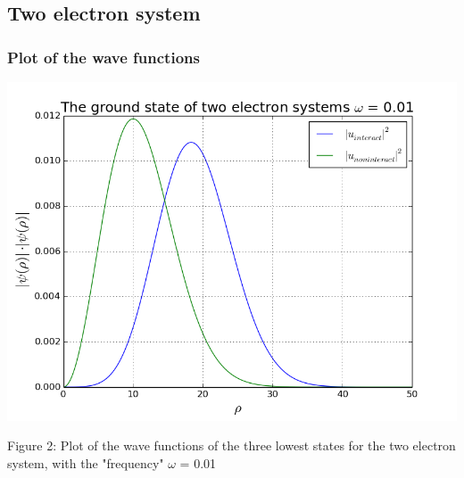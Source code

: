 \documentclass[norsk,a4paper,12pt]{article}
\begin{document}
\par
\vspace{5mm}

\subsection{Two electron system}
\par
\vspace{3mm}

\subsubsection{Plot of the wave functions}
\par
\vspace{3mm}

\includegraphics[scale=0.5]{wavefunc_two_omega=0_01}\par
\vspace{1mm}
Figure 2: Plot of the wave functions of the three lowest states for the two electron  system, with the "frequency" $\omega$ = 0.01
\par
\vspace{7mm}
\end{document}
